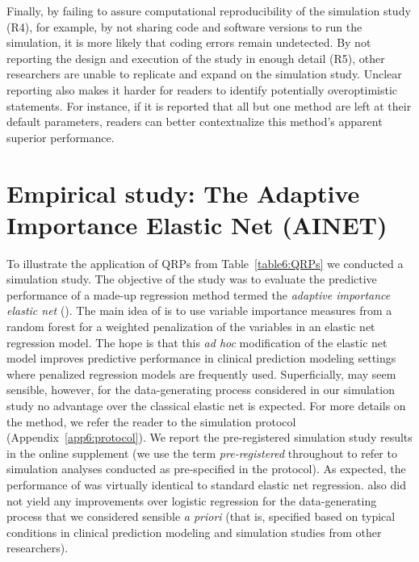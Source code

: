 Finally, by failing to assure computational reproducibility of the simulation
study (R4), for example, by not sharing code and software versions to run the
simulation, it is more likely that coding errors remain undetected. By not
reporting the design and execution of the study in enough detail (R5), other
researchers are unable to replicate and expand on the simulation study. Unclear
reporting also makes it harder for readers to identify potentially
overoptimistic statements. For instance, if it is reported that all but one
method are left at their default parameters, readers can better contextualize
this method's apparent superior performance.


\section{Empirical study: The Adaptive Importance Elastic Net
  (AINET)} \label{sec6:study}

To illustrate the application of QRPs from Table~\ref{table6:QRPs} we conducted
a simulation study. The objective of the study was to evaluate the predictive
performance of a made-up regression method termed the \emph{adaptive importance
  elastic net} (\ainet). The main idea of \ainet{} is to use variable importance
measures from a random forest for a weighted penalization of the variables in an
elastic net regression model. The hope is that this \emph{ad hoc} modification
of the elastic net model improves predictive performance in clinical prediction
modeling settings where penalized regression models are frequently used.
Superficially, \ainet{} may seem sensible, however, for the data-generating
process considered in our simulation study no advantage over the classical
elastic net is expected. For more details on the method, we refer the reader to
the simulation protocol (Appendix~\ref{app6:protocol}). We report the
pre-registered simulation study results in the online supplement (we use the
term \emph{pre-registered} throughout to refer to simulation analyses conducted
as pre-specified in the protocol). As expected, the performance of \ainet{} was
virtually identical to standard elastic net regression. \ainet{} also did not
yield any improvements over logistic regression for the data-generating process
that we considered sensible \emph{a priori} (that is, specified based on typical
conditions in clinical prediction modeling and simulation studies from other
researchers).


